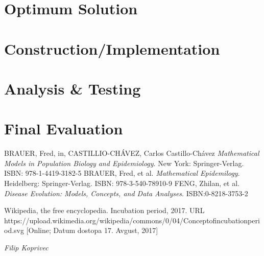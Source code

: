 \documentclass[a4paper, 11pt]{article}
\begin{document}
\section*{Optimum Solution}
\lipsum[4]

\section*{Construction/Implementation}
\lipsum[5]

\section*{Analysis \& Testing}
\lipsum[6]

\section*{Final Evaluation}
\lipsum[7]


\begin{thebibliography}{9}
 BRAUER, Fred, in, CASTILLIO-CHÁVEZ, Carlos Castillo-Chávez \emph{Mathematical Models in Population Biology and Epidemiology}. New York: Springer-Verlag. ISBN: 978-1-4419-3182-5
  BRAUER, Fred, et al. \emph{Mathematical Epidemilogy}. Heidelberg: Springer-Verlag. ISBN: 978-3-540-78910-9
 FENG, Zhilan, et al. \emph{Disease Evolution: Models, Concepts, and Data Analyses}. ISBN:0-8218-3753-2

 Wikipedia, the free encyclopedia. Incubation period, 2017. URL https://upload.wikimedia.org/wikipedia/commons/0/04/Concept\textunderscore of\textunderscore incubation\textunderscore period.svg [Online; Datum dostopa 17. Avgust, 2017]
\end{thebibliography}


\hfill \textit{Filip Koprivec}
\end{document}
